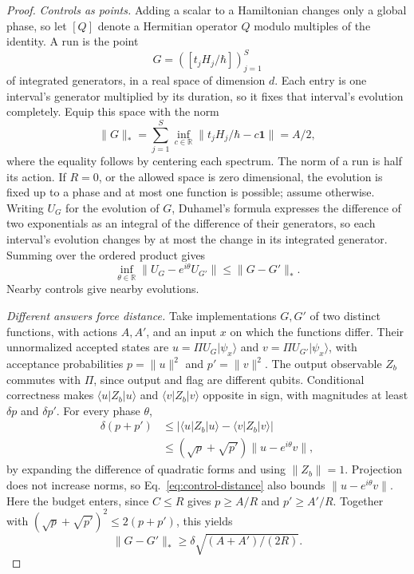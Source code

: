 \documentclass[11pt,a4paper]{article}
\providecommand{\openone}{\mathbf{1}}
\newcommand{\ket}[1]{\lvert #1\rangle}
\newcommand{\bra}[1]{\langle #1\rvert}
\newcommand{\norm}[1]{\lVert #1\rVert}
\newcommand{\id}{\openone}
\begin{document}
\begin{proof}
\emph{Controls as points.} Adding a scalar to a Hamiltonian changes only a global phase, so let $[Q]$ denote a Hermitian operator $Q$ modulo multiples of the identity. A run is the point
\begin{equation}
 G=([t_jH_j/\hbar])_{j=1}^S
\end{equation}
of integrated generators, in a real space of dimension $d$. Each entry is one interval's generator multiplied by its duration, so it fixes that interval's evolution completely. Equip this space with the norm
\begin{equation}
 \norm G_*=\sum_{j=1}^S\inf_{c\in\mathbb R}\norm{t_jH_j/\hbar-c\id}=A/2,
\end{equation}
where the equality follows by centering each spectrum. The norm of a run is half its action. If $R=0$, or the allowed space is zero dimensional, the evolution is fixed up to a phase and at most one function is possible; assume otherwise. Writing $U_G$ for the evolution of $G$, Duhamel's formula expresses the difference of two exponentials as an integral of the difference of their generators, so each interval's evolution changes by at most the change in its integrated generator. Summing over the ordered product gives
\begin{equation}
 \inf_{\theta\in\mathbb R}\norm{U_G-e^{i\theta}U_{G'}}\le\norm{G-G'}_*.
 \label{eq:control-distance}
\end{equation}
Nearby controls give nearby evolutions.

\emph{Different answers force distance.} Take implementations $G,G'$ of two distinct functions, with actions $A,A'$, and an input $x$ on which the functions differ. Their unnormalized accepted states are $u=\Pi U_G\ket{\psi_x}$ and $v=\Pi U_{G'}\ket{\psi_x}$, with acceptance probabilities $p=\norm u^2$ and $p'=\norm v^2$. The output observable $Z_b$ commutes with $\Pi$, since output and flag are different qubits. Conditional correctness makes $\bra u Z_b\ket u$ and $\bra v Z_b\ket v$ opposite in sign, with magnitudes at least $\delta p$ and $\delta p'$. For every phase $\theta$,
\begin{equation}
 \begin{aligned}
 \delta(p+p')&\le\bigl|\bra u Z_b\ket u-\bra v Z_b\ket v\bigr|\\
 &\le(\sqrt p+\sqrt{p'})\norm{u-e^{i\theta}v},
 \end{aligned}
\end{equation}
by expanding the difference of quadratic forms and using $\norm{Z_b}=1$. Projection does not increase norms, so Eq.~\eqref{eq:control-distance} also bounds $\norm{u-e^{i\theta}v}$. Here the budget enters, since $C\le R$ gives $p\ge A/R$ and $p'\ge A'/R$. Together with $(\sqrt p+\sqrt{p'})^2\le2(p+p')$, this yields
\begin{equation}
 \norm{G-G'}_*\ge\delta\sqrt{(A+A')/(2R)}.
 \label{eq:run-separation}
\end{equation}


\end{proof}
\end{document}
